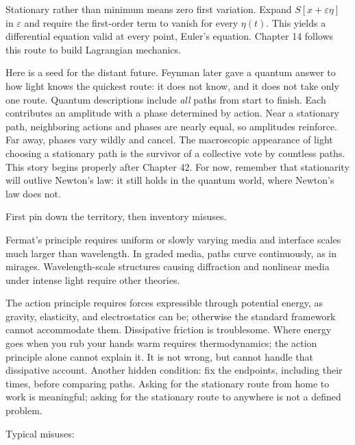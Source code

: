 \begin{challenge}
Stationary rather than minimum means zero first variation. Expand \(S[x+\varepsilon\eta]\) in \(\varepsilon\) and require the first-order term to vanish for every \(\eta(t)\). This yields a differential equation valid at every point, Euler's equation. Chapter 14 follows this route to build Lagrangian mechanics.

Here is a seed for the distant future. Feynman later gave a quantum answer to how light knows the quickest route: it does not know, and it does not take only one route. Quantum descriptions include \emph{all} paths from start to finish. Each contributes an amplitude with a phase determined by action. Near a stationary path, neighboring actions and phases are nearly equal, so amplitudes reinforce. Far away, phases vary wildly and cancel. The macroscopic appearance of light choosing a stationary path is the survivor of a collective vote by countless paths. This story begins properly after Chapter 42. For now, remember that stationarity will outlive Newton's law: it still holds in the quantum world, where Newton's law does not.
\end{challenge}


\begin{mainline}
First pin down the territory, then inventory misuses.

Fermat's principle requires uniform or slowly varying media and interface scales much larger than wavelength. In graded media, paths curve continuously, as in mirages. Wavelength-scale structures causing diffraction and nonlinear media under intense light require other theories.

The action principle requires forces expressible through potential energy, as gravity, elasticity, and electrostatics can be; otherwise the standard framework cannot accommodate them. Dissipative friction is troublesome. Where energy goes when you rub your hands warm requires thermodynamics; the action principle alone cannot explain it. It is not wrong, but cannot handle that dissipative account. Another hidden condition: fix the endpoints, including their times, before comparing paths. Asking for the stationary route from home to work is meaningful; asking for the stationary route to anywhere is not a defined problem.
\end{mainline}

Typical misuses:

